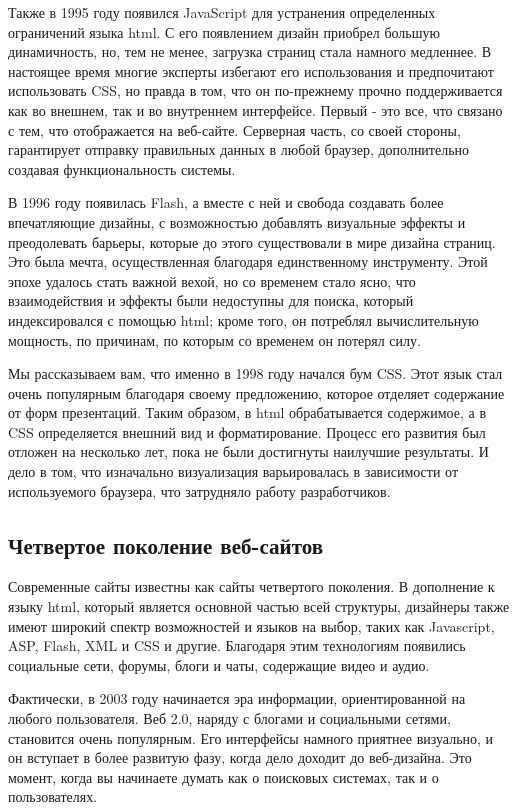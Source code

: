 Также в 1995 году появился JavaScript для устранения определенных ограничений языка html. С его появлением дизайн приобрел большую динамичность, но, тем не менее, загрузка страниц стала намного медленнее. В настоящее время многие эксперты избегают его использования и предпочитают использовать CSS, но правда в том, что он по-прежнему прочно поддерживается как во внешнем, так и во внутреннем интерфейсе. Первый - это все, что связано с тем, что отображается на веб-сайте. Серверная часть, со своей стороны, гарантирует отправку правильных данных в любой браузер, дополнительно создавая функциональность системы.

В 1996 году появилась Flash, а вместе с ней и свобода создавать более впечатляющие дизайны, с возможностью добавлять визуальные эффекты и преодолевать барьеры, которые до этого существовали в мире дизайна страниц. Это была мечта, осуществленная благодаря единственному инструменту. Этой эпохе удалось стать важной вехой, но со временем стало ясно, что взаимодействия и эффекты были недоступны для поиска, который индексировался с помощью html; кроме того, он потреблял вычислительную мощность, по причинам, по которым со временем он потерял силу.

Мы рассказываем вам, что именно в 1998 году начался бум CSS. Этот язык стал очень популярным благодаря своему предложению, которое отделяет содержание от форм презентаций. Таким образом, в html обрабатывается содержимое, а в CSS определяется внешний вид и форматирование. Процесс его развития был отложен на несколько лет, пока не были достигнуты наилучшие результаты. И дело в том, что изначально визуализация варьировалась в зависимости от используемого браузера, что затрудняло работу разработчиков.

\subsection{Четвертое поколение веб-сайтов}
Современные сайты известны как сайты четвертого поколения. В дополнение к языку html, который является основной частью всей структуры, дизайнеры также имеют широкий спектр возможностей и языков на выбор, таких как Javascript, ASP, Flash, XML и CSS и другие. Благодаря этим технологиям появились социальные сети, форумы, блоги и чаты, содержащие видео и аудио.

Фактически, в 2003 году начинается эра информации, ориентированной на любого пользователя. Веб 2.0, наряду с блогами и социальными сетями, становится очень популярным. Его интерфейсы намного приятнее визуально, и он вступает в более развитую фазу, когда дело доходит до веб-дизайна. Это момент, когда вы начинаете думать как о поисковых системах, так и о пользователях.

